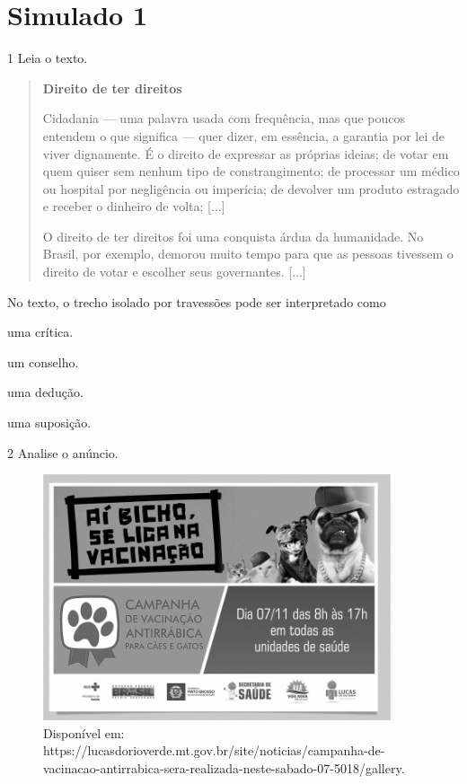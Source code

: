 \section{Simulado 1}

\num{1} Leia o texto.

\begin{quote}
\centering\textbf{Direito de ter direitos}

Cidadania --- uma palavra usada com frequência, mas que poucos entendem o
que significa --- quer dizer, em essência, a garantia por lei de viver
dignamente. É o direito de expressar as próprias ideias; de votar em
quem quiser sem nenhum tipo de constrangimento; de processar um médico
ou hospital por negligência ou imperícia; de devolver um produto
estragado e receber o dinheiro de volta; {[}...{]}

O direito de ter direitos foi uma conquista árdua da humanidade. No
Brasil, por exemplo, demorou muito tempo para que as pessoas tivessem o
direito de votar e escolher seus governantes. {[}...{]}

\end{quote}

No texto, o trecho isolado por travessões pode ser interpretado como

\begin{escolha}
\item uma crítica.

\item um conselho.

\item uma dedução.

\item uma suposição.
\end{escolha}

\num{2} Analise o anúncio.

\begin{figure}[H]
\centering
\includegraphics[width=4.03125in,height=2.85231in]{./imgSAEB_8_POR/media/image28.png}
\caption{Disponível em: https://lucasdorioverde.mt.gov.br/site/noticias/campanha-de-vacinacao-antirrabica-sera-realizada-neste-sabado-07-5018/gallery.}
\end{figure}

